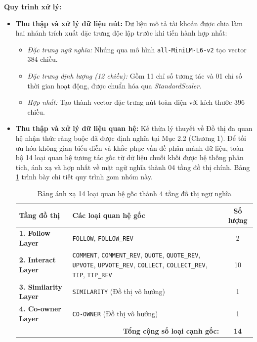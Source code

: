 \textbf{Quy trình xử lý:}
\begin{itemize}[label={--}, itemsep=3pt]
    \item \textbf{Thu thập và xử lý dữ liệu nút:} Dữ liệu mô tả tài khoản được chia làm hai nhánh trích xuất đặc trưng độc lập trước khi tiến hành hợp nhất:
    \begin{itemize}[label={+}, itemsep=3pt]
        \item \textit{Đặc trưng ngữ nghĩa:} Nhúng qua mô hình \texttt{all-MiniLM-L6-v2} tạo vector 384 chiều.
        \item \textit{Đặc trưng định lượng (12 chiều):} Gồm 11 chỉ số tương tác và 01 chỉ số thời gian hoạt động, được chuẩn hóa qua \textit{StandardScaler}.
        \item \textit{Hợp nhất:} Tạo thành vector đặc trưng nút toàn diện với kích thước 396 chiều.
    \end{itemize}

    \item \textbf{Thu thập và xử lý dữ liệu quan hệ:} Kế thừa lý thuyết về Đồ thị đa quan hệ nhận thức ràng buộc đã được định nghĩa tại Mục 2.2 (Chương 1). Để tối ưu hóa không gian biểu diễn và khắc phục vấn đề phân mảnh dữ liệu, toàn bộ 14 loại quan hệ tương tác gốc từ dữ liệu chuỗi khối được hệ thống phân tích, ánh xạ và hợp nhất về mặt ngữ nghĩa thành 04 tầng đồ thị chính. Bảng \ref{tab:edge_mapping} trình bày chi tiết quy trình gom nhóm này.

    \begin{table}[H]
        \centering
        \caption{Bảng ánh xạ 14 loại quan hệ gốc thành 4 tầng đồ thị ngữ nghĩa}
        \label{tab:edge_mapping}
        \renewcommand{\arraystretch}{1.4} %
        \setlength{\tabcolsep}{8pt}
        \begin{tabular}{|p{3cm}|p{8cm}|c|}
            \hline
            \textbf{Tầng đồ thị} & \textbf{Các loại quan hệ gốc} & \textbf{Số lượng} \\
            \hline
            \textbf{1. Follow Layer} & \texttt{FOLLOW}, \texttt{FOLLOW\_REV} & 2 \\
            \hline
            \textbf{2. Interact Layer} & \texttt{COMMENT}, \texttt{COMMENT\_REV}, \texttt{QUOTE}, \texttt{QUOTE\_REV}, \texttt{UPVOTE}, \texttt{UPVOTE\_REV}, \texttt{COLLECT}, \texttt{COLLECT\_REV}, \texttt{TIP}, \texttt{TIP\_REV} & 10 \\
            \hline
            \textbf{3. Similarity Layer} & \texttt{SIMILARITY} (Đồ thị vô hướng) & 1 \\
            \hline
            \textbf{4. Co-owner Layer} & \texttt{CO-OWNER} (Đồ thị vô hướng) & 1 \\
            \hline
            \multicolumn{2}{|r|}{\textbf{Tổng cộng số loại cạnh gốc:}} & \textbf{14} \\
            \hline
        \end{tabular}
    \end{table}


\end{itemize}
